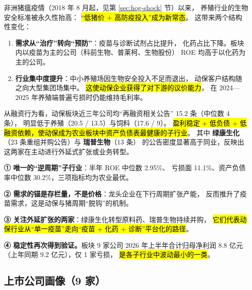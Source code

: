 非洲猪瘟疫情（2018 年 8 月起，见第 \ref{sec:hog-shock} 节）以来，
养殖行业的生物安全标准被永久性抬高：
\hl{“低猪价 + 高防疫投入”成为新常态}。
这带来两个结构性变化：

\begin{enumerate}[leftmargin=1.5em, itemsep=2pt]
  \item \textbf{需求从“治疗”转向“预防”}：疫苗与诊断试剂占比提升，
        化药占比下降。板块内以疫苗为主的公司（科前生物、普莱柯、生物股份）
        ROE 均高于以化药为主的公司。
  \item \textbf{行业集中度提升}：中小养殖场因生物安全投入不足而退出，
        动保客户结构随之向大型集团场集中。
        \hl{这使动保企业获得了对下游的议价能力}，
        在 2024---2025 年养殖端普遍亏损时仍能维持毛利率。
\end{enumerate}

从融资行为看，动保板块近三年公司均“再融资相关公告” \num{15.2} 条（中位数 \num{4} 条），
明显低于养殖（\num{20.5} / \num{13.5}）与饲料（\num{17.6} / \num{9}）。
\hl{盈利稳定 + 低负债 + 低融资依赖，使动保成为农业板块中资产负债表最健康的子行业}。
其中 \textbf{绿康生化}（\num{23} 条重组并购公告）与 \textbf{瑞普生物}（\num{13} 条）
的公告密度显著高于同业，反映出这两家在主动进行外延式扩张或业务转型。

\begin{keybox}[动物保健的画像结论]
\normalsize
\textbf{① 唯一的“逆周期”子行业}：半年 ROE 中位数 \num{2.95}\%、
亏损面 \num{11.1}\%、资产负债率中位数 \num{30.2}\%，三项指标均为农业最优。\par\vspace{3pt}
\textbf{② 需求的锚是存栏量，不是价格}：龙头企业在下行周期扩张产能，
反而推升了疫苗需求，这是动保与猪周期“脱钩”的机制。\par\vspace{3pt}
\textbf{③ 关注外延扩张的两家}：绿康生化转型原料药、瑞普生物持续并购，
\hl{它们代表动保行业从“单一疫苗”走向“疫苗 + 化药 + 诊断”平台化的路径}。\par\vspace{3pt}
\textbf{④ 稳定性再次得到验证。}板块 \num{9} 家公司 2026 年上半年合计归母净利润
\num{8.8} 亿元（上年同期 \num{9.2} 亿元），仅 \num{1} 家亏损，
\hl{是各子行业中波动最小的一类}。
\end{keybox}

\subsection{上市公司画像（\num{9} 家）}
\label{sec:co-vet}

